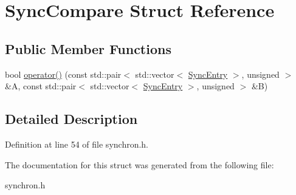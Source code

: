 \hypertarget{structSyncCompare}{
\section{Sync\-Compare Struct Reference}
\label{structSyncCompare}
}
\subsection*{Public Member Functions}
\begin{CompactItemize}
\item 
\hypertarget{structSyncCompare_26ba03de10f15ad5e3fcb81c2a4244c0}{
bool \hyperlink{structSyncCompare_26ba03de10f15ad5e3fcb81c2a4244c0}{operator()} (const std::pair$<$ std::vector$<$ \hyperlink{structSyncEntry}{Sync\-Entry} $>$, unsigned $>$ \&A, const std::pair$<$ std::vector$<$ \hyperlink{structSyncEntry}{Sync\-Entry} $>$, unsigned $>$ \&B)}
\label{structSyncCompare_26ba03de10f15ad5e3fcb81c2a4244c0}

\end{CompactItemize}


\subsection{Detailed Description}




Definition at line 54 of file synchron.h.

The documentation for this struct was generated from the following file:\begin{CompactItemize}
\item 
synchron.h\end{CompactItemize}

